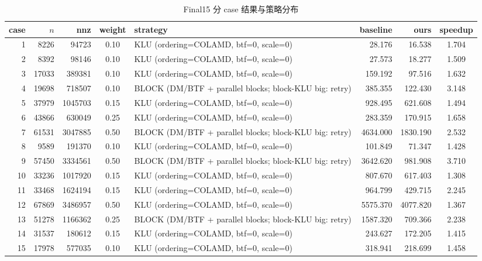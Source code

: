 \documentclass[12pt,a4paper,fontset=none]{ctexart}
\begin{document}
\begin{table}[H]
\centering
\caption{Final15 分 case 结果与策略分布}
\label{tab:finalcases}
\scriptsize
\setlength{\tabcolsep}{3pt}
\renewcommand{\arraystretch}{1.14}
\begin{tabular}{r r r c p{4.6cm} r r c}
\toprule
case & $n$ & nnz & weight & strategy & baseline & ours & speedup \\
\midrule
1 & 8226 & 94723 & 0.10 & KLU (ordering=COLAMD, btf=0, scale=0) & 28.176 & 16.538 & 1.704 \\
2 & 8392 & 98146 & 0.10 & KLU (ordering=COLAMD, btf=0, scale=0) & 27.573 & 18.277 & 1.509 \\
3 & 17033 & 389381 & 0.10 & KLU (ordering=COLAMD, btf=0, scale=0) & 159.192 & 97.516 & 1.632 \\
4 & 19698 & 718507 & 0.10 & BLOCK (DM/BTF + parallel blocks; block-KLU big: retry) & 385.355 & 122.430 & 3.148 \\
5 & 37979 & 1045703 & 0.15 & KLU (ordering=COLAMD, btf=0, scale=0) & 928.495 & 621.608 & 1.494 \\
6 & 43866 & 630049 & 0.25 & KLU (ordering=COLAMD, btf=0, scale=0) & 283.359 & 170.915 & 1.658 \\
7 & 61531 & 3047885 & 0.50 & BLOCK (DM/BTF + parallel blocks; block-KLU big: retry) & 4634.000 & 1830.190 & 2.532 \\
8 & 9589 & 191370 & 0.10 & KLU (ordering=COLAMD, btf=0, scale=0) & 101.849 & 71.347 & 1.428 \\
9 & 57450 & 3334561 & 0.50 & BLOCK (DM/BTF + parallel blocks; block-KLU big: retry) & 3642.620 & 981.908 & 3.710 \\
10 & 33236 & 1017920 & 0.15 & KLU (ordering=COLAMD, btf=0, scale=0) & 807.670 & 617.403 & 1.308 \\
11 & 33468 & 1624194 & 0.15 & KLU (ordering=COLAMD, btf=0, scale=0) & 964.799 & 429.715 & 2.245 \\
12 & 67869 & 3486957 & 0.50 & KLU (ordering=COLAMD, btf=0, scale=0) & 5575.370 & 4077.820 & 1.367 \\
13 & 51278 & 1166362 & 0.25 & BLOCK (DM/BTF + parallel blocks; block-KLU big: retry) & 1587.320 & 709.366 & 2.238 \\
14 & 31537 & 180612 & 0.15 & KLU (ordering=COLAMD, btf=0, scale=0) & 243.627 & 172.205 & 1.415 \\
15 & 17978 & 577035 & 0.10 & KLU (ordering=COLAMD, btf=0, scale=0) & 318.941 & 218.699 & 1.458 \\
\bottomrule
\end{tabular}
\end{table}
\end{document}
